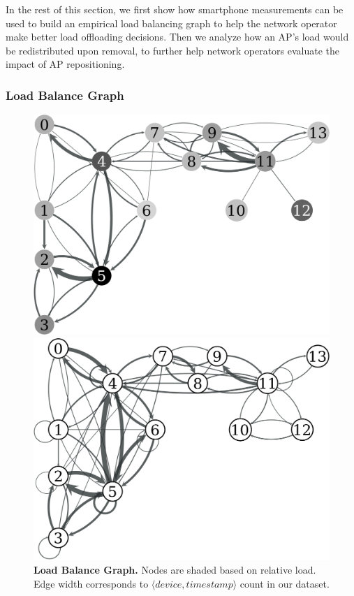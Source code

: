 In the rest of this section, we first show how smartphone measurements can be
used to build an empirical load balancing graph to help the network operator
make better load offloading decisions. Then we analyze how an AP's load would be
redistributed upon removal, to further help network operators evaluate the
impact of AP repositioning.


\subsubsection{Load Balance Graph}
\label{subsec:load_balance}

\begin{figure}
  \centering
  \begin{minipage}[t]{0.31\textwidth}
    \includegraphics[width=\textwidth]{./figures/DavisLoadBalanceGraph.pdf}
    \caption{\textbf{Load Balance Graph.} Nodes are shaded based on 
      relative load. Edge width corresponds to $\langle device, timestamp \rangle$
    count in our dataset.}
    \label{fig:davis_load_balance}
  \end{minipage}\hspace{0.02\textwidth}%
  \begin{minipage}[t]{0.31\textwidth}
    \includegraphics[width=\textwidth]{./figures/DavisLoadRedistributionGraph.pdf}

\end{minipage}
\end{figure}
